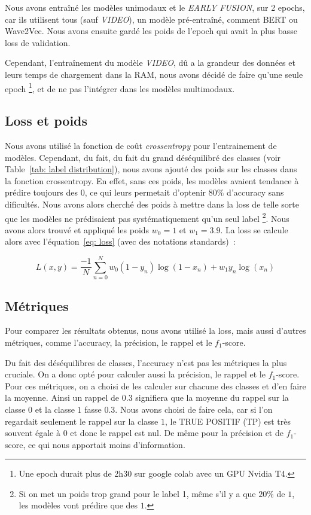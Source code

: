 Nous avons entraîné les modèles unimodaux et le \textit{EARLY FUSION}, sur 2 epochs, car ils utilisent tous (sauf \textit{VIDEO}), 
un modèle pré-entraîné, comment BERT ou Wave2Vec. Nous avons ensuite gardé les poids de 
l'epoch qui avait la plus basse loss de validation.

Cependant, l'entraînement du modèle \textit{VIDEO}, dû a la grandeur des données et 
leurs temps de chargement dans la RAM, nous avons décidé de faire qu'une seule epoch
\footnote{Une epoch durait plus de 2h30 sur google colab avec un GPU Nvidia T4.}, et de ne pas l'intégrer dans les modèles multimodaux.

\subsection{Loss et poids}
Nous avons utilisé la fonction de coût \textit{crossentropy} pour l'entrainement de modèles. 
Cependant, du fait, du fait du grand déséquilibré des classes (voir Table~\ref{tab: label distribution}), nous avons ajouté des poids 
sur les classes dans la fonction crossentropy. En effet, sans ces poids, les modèles avaient tendance à prédire toujours des $0$, ce 
qui leurs permetait d'optenir $80\%$ d'accuracy sans dificultés. Nous avons alors cherché des poids à mettre dans la loss de telle sorte 
que les modèles ne prédisaient pas systématiquement qu'un seul label
\footnote{Si on met un poids trop grand pour le label 1, même s'il y a que $20\%$ de $1$, les modèles vont prédire que des $1$.}.
Nous avons alors trouvé et appliqué les poids $w_0 = 1$ et $w_1=3.9$. La loss se calcule alors avec l'équation~\ref{eq: loss}
(avec des notations standards)~:

\begin{equation}
    L(x, y) = \frac{-1}{N} \sum_{n=0}^{N} w_0 (1-y_n) \log(1-x_n) + w_1 y_n \log(x_n)
    \label{eq: loss}
\end{equation}

\subsection{Métriques}
Pour comparer les résultats obtenus, nous avons utilisé la loss, mais aussi d'autres métriques,
comme l'accuracy, la précision, le rappel et le $f_1$-score.

Du fait des déséquilibres de classes, l'accuracy n'est pas les métriques la plus cruciale. On a donc opté pour 
calculer aussi la précision, le rappel et le $f_1$-score. Pour ces métriques, on a choisi de les calculer 
sur chacune des classes et d'en faire la moyenne. Ainsi un rappel de $0.3$ signifiera que la moyenne du rappel sur
la classe $0$ et la classe $1$ fasse $0.3$. Nous avons choisi de faire cela, car si l'on regardait seulement 
le rappel sur la classe $1$, le TRUE POSITIF (TP) est très souvent égale à $0$ et donc le rappel est nul. De même 
pour la précision et de $f_1$-score, ce qui nous apportait moins d'information.